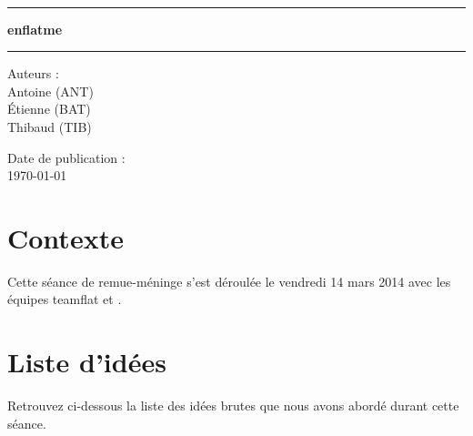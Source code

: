 \documentclass[a4paper, 12pt, french]{article}
\newcommand{\nomProjet}{enflatme\xspace}
\begin{document}
	\begin{titlepage}
		\begin{center}
			\LARGE{} \\
		    \rule{\linewidth}{1.5pt}
		    \huge{\textbf{\nomProjet}}
		    \rule{\linewidth}{1.5pt} \newline{} \newline{}
		\end{center}
		\begin{center}
		    \large{Auteurs :}\\ Antoine  (ANT)\\ Étienne  (BAT) \\ Thibaud  (TIB)
		\end{center}
		\vspace{50px}
		\begin{center}
			\large{Date de publication :}\\ \today
		\end{center}
	\end{titlepage}

	\section{Contexte}
	Cette séance de remue-méninge s'est déroulée le vendredi 14 mars 2014 avec les équipes teamflat et .

	\section{Liste d'idées}
	Retrouvez ci-dessous la liste des idées brutes que nous avons abordé durant cette séance.
\end{document}
